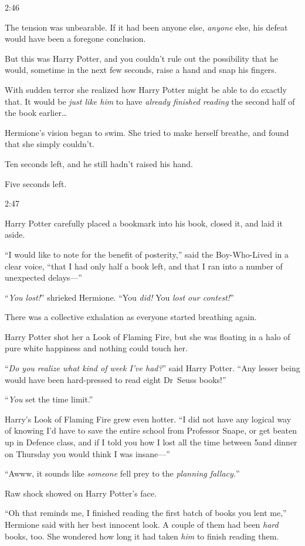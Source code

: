 2:46\pm

The tension was unbearable. If it had been anyone else, \emph{anyone} else, his defeat would have been a foregone conclusion.

But this was Harry Potter, and you couldn’t rule out the possibility that he would, sometime in the next few seconds, raise a hand and snap his fingers.

With sudden terror she realized how Harry Potter might be able to do exactly that. It would be \emph{just like him} to have \emph{already finished reading} the second half of the book earlier…

Hermione’s vision began to swim. She tried to make herself breathe, and found that she simply couldn’t.

Ten seconds left, and he still hadn’t raised his hand.

Five seconds left.

2:47\pm

Harry Potter carefully placed a bookmark into his book, closed it, and laid it aside.

“I would like to note for the benefit of posterity,” said the Boy-Who-Lived in a clear voice, “that I had only half a book left, and that I ran into a number of unexpected delays—”

“\emph{You lost!}” shrieked Hermione. “You \emph{did!} You \emph{lost our contest!}”

There was a collective exhalation as everyone started breathing again.

Harry Potter shot her a Look of Flaming Fire, but she was floating in a halo of pure white happiness and nothing could touch her.

“\emph{Do you realize what kind of week I’ve had?}” said Harry Potter. “Any lesser being would have been hard-pressed to read eight Dr~Seuss books!”

“\emph{You} set the time limit.”

Harry’s Look of Flaming Fire grew even hotter. “I did not have any logical way of knowing I’d have to save the entire school from Professor Snape, or get beaten up in Defence class, and if I told you how I lost all the time between 5\pm and dinner on Thursday you would think I was insane—”

“Awww, it sounds like \emph{someone} fell prey to the \emph{planning fallacy.}”

Raw shock showed on Harry Potter’s face.

“Oh that reminds me, I finished reading the first batch of books you lent me,” Hermione said with her best innocent look. A couple of them had been \emph{hard} books, too. She wondered how long it had taken \emph{him} to finish reading them.

